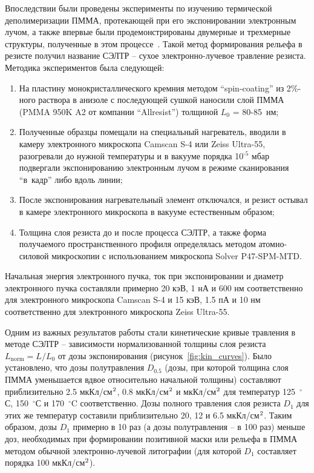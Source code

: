 Впоследствии были проведены эксперименты по изучению термической деполимеризации ПММА, протекающей при его экспонировании электронным лучом, а также впервые были продемонстрированы двумерные и трехмерные структуры, полученные в этом процессе~\cite{Bruk_2013}. Такой метод формирования рельефа в резисте получил название СЭЛТР -- сухое электронно-лучевое травление резиста. Методика экспериментов была следующей:
\begin{enumerate}
	\item На пластину монокристаллического кремния методом ``spin-coating'' из 2\%-ного раствора в анизоле с последующей сушкой наносили слой \linebreak ПММА (PMMA 950K A2 от компании ``Allresist'') толщиной $L_0$ = 80-85~нм;
	\item Полученные образцы помещали на специальный нагреватель, вводили в камеру электронного микроскопа Camscan S-4 или Zeiss Ultra-55, разогревали до нужной температуры и в вакууме порядка 10$^\text{-5}$ мбар подвергали экспонированию электронным лучом в режиме сканирования ``в~кадр'' либо вдоль линии;
	\item После экспонирования нагревательный элемент отключался, и резист остывал в камере электронного микроскопа в вакууме естественным образом;
	\item Толщина слоя резиста до и после процесса СЭЛТР, а также форма получаемого пространственного профиля определялась методом атомно-силовой микроскопии с использованием микроскопа Solver P47-SPM-MTD.
\end{enumerate}

Начальная энергия электронного пучка, ток при экспонировании и диаметр электронного пучка составляли примерно 20 кэВ, 1 нА и 600 нм соответственно для электронного микроскопа Camscan S-4 и 15 кэВ, 1.5 пА и 10 нм соответственно для электронного микроскопа Zeiss Ultra-55.

Одним из важных результатов работы стали кинетические кривые травления в методе СЭЛТР -- зависимости нормализованной толщины слоя резиста $L_\mathrm{norm} = L/L_0$ от дозы экспонирования (рисунок~\ref{fig:kin_curves}). Было установлено, что дозы полутравления $D_\text{0.5}$ (дозы, при которой толщина слоя ПММА уменьшается вдвое относительно начальной толщины) составляют приблизительно 2.5 мкКл/см$^\text{2}$, 0.8 мкКл/см$^\text{2}$ и  мкКл/см$^\text{2}$ для температур 125~$^\circ$С, 150~$^\circ$С и 170~$^\circ$C соответственно. Дозы полного травления слоя резиста $D_\text{1}$ для этих же температур составили приблизительно 20, 12 и 6.5 мкКл/см$^\text{2}$. Таким образом, дозы $D_\text{1}$ примерно в 10 раз (а дозы полутравления -- в 100 раз) меньше доз, необходимых при формировании позитивной маски или рельефа в ПММА методом обычной электронно-лучевой литографии (для которой $D_\text{1}$ составляет порядка 100 мкКл/см$^\text{2}$).

